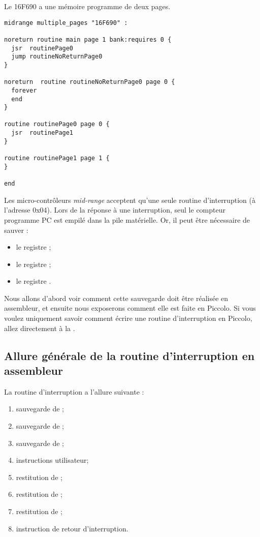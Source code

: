 Le 16F690 a une mémoire programme de deux pages. 

\begin{lstlisting}[language=piccolo]
midrange multiple_pages "16F690" :

noreturn routine main page 1 bank:requires 0 {
  jsr  routinePage0
  jump routineNoReturnPage0
}

noreturn  routine routineNoReturnPage0 page 0 {
  forever
  end
}

routine routinePage0 page 0 {
  jsr  routinePage1
}

routine routinePage1 page 1 {
}

end
\end{lstlisting}














Les micro-contrôleurs \emph{mid-range} acceptent qu’une seule routine d’interruption (à l’adresse 0x04). Lors de la réponse à une interruption, seul le compteur programme PC est empilé dans la pile matérielle. Or, il peut être nécessaire de sauver :
\begin{itemize}
  \item le registre  ;
  \item le registre  ;
  \item le registre .
\end{itemize}

Nous allons d'abord voir comment cette sauvegarde doit être réalisée en assembleur, et ensuite nous exposerons comment elle est faite en Piccolo. Si vous voulez uniquement savoir comment écrire une routine d'interruption en Piccolo, allez directement à la .

\subsection{Allure générale de la routine d'interruption en assembleur}

La routine d'interruption a l'allure suivante :
\begin{enumerate}
  \item sauvegarde de  ;
  \item sauvegarde de  ;
  \item sauvegarde de  ;
  \item instructions utilisateur;
  \item restitution de  ;
  \item restitution de  ;
  \item restitution de  ;
  \item instruction de retour d'interruption.
\end{enumerate}


